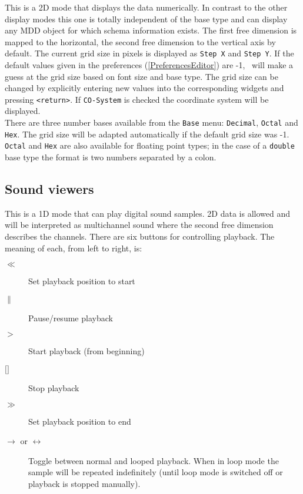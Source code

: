 \documentclass[11pt]{article}
\begin{document}
This is a 2D mode that displays the data numerically. In contrast to the other display
modes this one is totally independent of the base type and can display any MDD object
for which schema information exists. The first free dimension is mapped to the horizontal,
the second free dimension to the vertical axis by default. The current grid size in pixels
is displayed as \texttt{Step X} and \texttt{Step Y}. If the default values given in the
preferences (\ref{PreferencesEditor}) are -1, \rview\ will
make a guess at the grid size based on font size and base type. The grid size can
be changed by explicitly entering new values into the corresponding widgets and
pressing \texttt{<return>}. If \texttt{CO-System} is checked the coordinate system will
be displayed.\\
There are three number bases available from the \texttt{Base} menu: \texttt{Decimal}, \texttt{Octal}
and \texttt{Hex}. The grid size will be adapted automatically if the default grid size
was -1. \texttt{Octal} and \texttt{Hex} are also available for floating point types; in
the case of a \texttt{double} base type the format is two numbers separated by a colon.


\subsection{Sound viewers}
\label{SoundDisplayMode}

This is a 1D mode that can play digital sound samples. 2D data is allowed and will
be interpreted as multichannel sound where the second free dimension describes the
channels. There are six buttons for controlling playback. The meaning of each, from left
to right, is:

\begin{description}
\item[{\boldmath $\ll$}] Set playback position to start
\item[{\boldmath $\|$}] Pause/resume playback
\item[{\boldmath $>$}] Start playback (from beginning)
\item[{\boldmath $\lbrack\rbrack$}] Stop playback
\item[{\boldmath $\gg$}] Set playback position to end
\item[{\boldmath $\longrightarrow$ \mbox{\rm or} $\longleftrightarrow$}] Toggle between normal and looped playback. When in
loop mode the sample will be repeated indefinitely (until loop mode is switched off
or playback is stopped manually).
\end{description}
\end{document}
